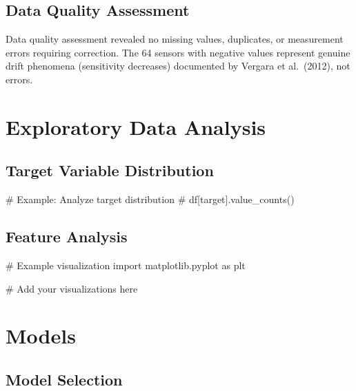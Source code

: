\documentclass[
  letterpaper,
  DIV=11,
  numbers=noendperiod]{scrartcl}
\newenvironment{Shaded}{\begin{snugshade}}{\end{snugshade}}
\newcommand{\CommentTok}[1]{\textcolor[rgb]{0.37,0.37,0.37}{#1}}
\newcommand{\ImportTok}[1]{\textcolor[rgb]{0.00,0.46,0.62}{#1}}
\newcommand{\NormalTok}[1]{\textcolor[rgb]{0.00,0.23,0.31}{#1}}
\renewenvironment{Shaded}{%
  \begin{tcolorbox}[%
    enhanced,%
    colback=codebg,%
    colframe=codebg,%
    borderline west={3pt}{0pt}{sectionblue},%
    fontupper=\small\ttfamily,%
    boxrule=0pt,%
    arc=0pt,%
    boxsep=5pt,%
    left=2mm,%
    right=2mm,%
    top=2mm,%
    bottom=2mm%
  ]%
}{%
  \end{tcolorbox}%
}
\begin{document}
\subsection{Data Quality Assessment}\label{data-quality-assessment}

Data quality assessment revealed no missing values, duplicates, or
measurement errors requiring correction. The 64 sensors with negative
values represent genuine drift phenomena (sensitivity decreases)
documented by Vergara et al.~(2012), not errors.

\section{Exploratory Data Analysis}\label{exploratory-data-analysis}

\subsection{Target Variable
Distribution}\label{target-variable-distribution}

\begin{Shaded}
\begin{Highlighting}[]
\CommentTok{\# Example: Analyze target distribution}
\CommentTok{\# df[\textquotesingle{}target\textquotesingle{}].value\_counts()}
\end{Highlighting}
\end{Shaded}

\subsection{Feature Analysis}\label{feature-analysis}

\begin{Shaded}
\begin{Highlighting}[]
\CommentTok{\# Example visualization}
\ImportTok{import}\NormalTok{ matplotlib.pyplot }\ImportTok{as}\NormalTok{ plt}

\CommentTok{\# Add your visualizations here}
\end{Highlighting}
\end{Shaded}

\section{Models}\label{models}

\subsection{Model Selection}\label{model-selection}
\end{document}
